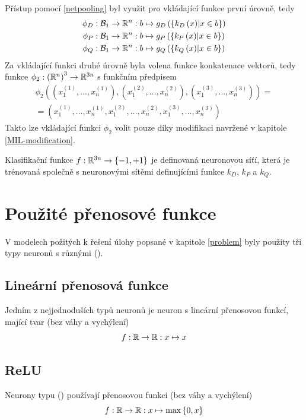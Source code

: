 Přístup pomocí \eqref{netpooling} byl využit pro vkládající funkce první úrovně, tedy
\begin{align*}
	\phi_D &: \mathcal B_1 \to \mathbb R^n : b \mapsto g_D \left( \left\{ k_D \left( x \right) \middle| x \in b \right\} \right) \\
	\phi_P &: \mathcal B_1 \to \mathbb R^n : b \mapsto g_P \left( \left\{ k_P \left( x \right) \middle| x \in b \right\} \right) \\
	\phi_Q &: \mathcal B_1 \to \mathbb R^n : b \mapsto g_Q \left( \left\{ k_Q \left( x \right) \middle| x \in b \right\} \right)
\end{align*}
Za vkládající funkci druhé úrovně byla volena funkce konkatenace vektorů, tedy funkce \( \phi_2 : \left( \mathbb R^n \right)^3  \to \mathbb R^{3n} \) s funkčním předpisem
\begin{multline}
	\phi_2 \left( \left( x_1^{(1)}, \dots, x_n^{(1)} \right), \left( x_1^{(2)}, \dots, x_n^{(2)} \right), \left( x_1^{(3)}, \dots, x_n^{(3)} \right) \right) = \\
	= \left( x_1^{(1)}, \dots, x_n^{(1)}, x_1^{(2)}, \dots, x_n^{(2)}, x_1^{(3)}, \dots, x_n^{(3)} \right)
\end{multline}
Takto lze vkládající funkci \( \phi_2 \) volit pouze díky modifikaci navržené v kapitole \ref{MIL-modification}.

Klasifikační funkce \( f : \mathbb R^{3n} \to \left\{ -1, +1 \right\} \) je definovaná neuronovou síťí, která je trénovaná společně s neuronovými sítěmi definujícími funkce \( k_D \), \( k_P \) a \( k_Q \).

\section{Použité přenosové funkce}
V modelech požitých k řešení úlohy popsané v kapitole \ref{problem} byly použity tři typy neuronů s různými  ().

\subsection{Lineární přenosová funkce}
Jedním z nejjednoduších typů neuronů je neuron s lineární přenosovou funkcí, mající tvar (bez váhy a vychýlení)
\[ f : \mathbb R \to \mathbb R : x \mapsto x \]

\subsection{ReLU}
Neurony typu  () používají přenosovou funkci (bez váhy a vychýlení)
\[ f : \mathbb R \to \mathbb R : x \mapsto \max \left\{ 0, x \right\} \]

